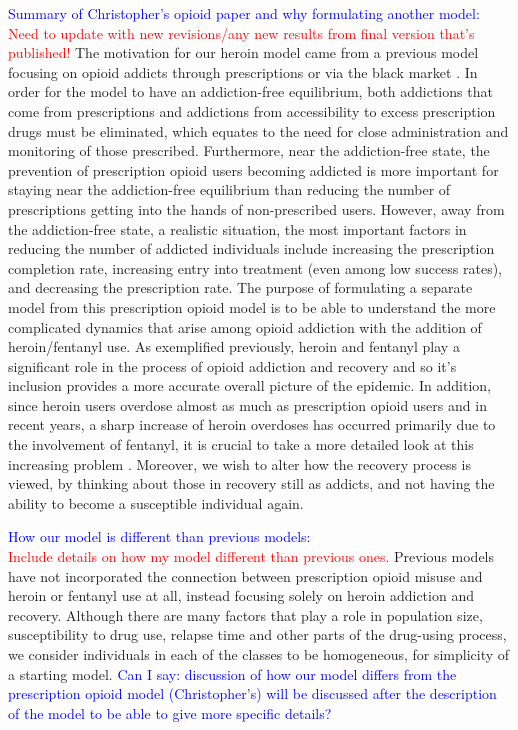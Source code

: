 \documentclass[12pt]{article}
\begin{document}
\textcolor{blue}{Summary of Christopher's opioid paper and why formulating another model:} \\
\textcolor{red}{Need to update with new revisions/any new results from final version that's published!} The motivation for our heroin model came from a previous model focusing on opioid addicts through prescriptions or via the black market \cite{Battista}. In order for the model to have an addiction-free equilibrium, both addictions that come from prescriptions and addictions from accessibility to excess prescription drugs must be eliminated, which equates to the need for close administration and monitoring of those prescribed. Furthermore, near the addiction-free state, the prevention of prescription opioid users becoming addicted is more important for staying near the addiction-free equilibrium than reducing the number of prescriptions getting into the hands of non-prescribed users. However, away from the addiction-free state, a realistic situation, the most important factors in reducing the number of addicted individuals include increasing the prescription completion rate, increasing entry into treatment (even among low success rates), and decreasing the prescription rate. The purpose of formulating a separate model from this prescription opioid model is to be able to understand the more complicated dynamics that arise among opioid addiction with the addition of heroin/fentanyl use. As exemplified previously, heroin and fentanyl play a significant role in the process of opioid addiction and recovery and so it's inclusion provides a more accurate overall picture of the epidemic. In addition, since heroin users overdose almost as much as prescription opioid users and in recent years, a sharp increase of heroin overdoses has occurred primarily due to the involvement of fentanyl, it is crucial to take a more detailed look at this increasing problem \cite{CDC4}. Moreover, we wish to alter how the recovery process is viewed, by thinking about those in recovery still as addicts, and not having the ability to become a susceptible individual again. 




\textcolor{blue}{How our model is different than previous models:} \\
\textcolor{red}{Include details on how my model different than previous ones.} Previous models have not incorporated the connection between prescription opioid misuse and heroin or fentanyl use at all, instead focusing solely on heroin addiction and recovery. Although there are many factors that play a role in population size, susceptibility to drug use, relapse time and other parts of the drug-using process, we consider individuals in each of the classes to be homogeneous, for simplicity of a starting model. \textcolor{blue}{Can I say: discussion of how our model differs from the prescription opioid model (Christopher's) will be discussed after the description of the model to be able to give more specific details?}
\end{document}
